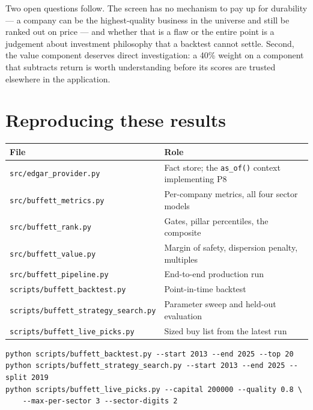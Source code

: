 \documentclass[11pt,a4paper]{article}
\begin{document}
Two open questions follow. The screen has no mechanism to pay up for
durability --- a company can be the highest-quality business in the universe and
still be ranked out on price --- and whether that is a flaw or the entire point
is a judgement about investment philosophy that a backtest cannot settle.
Second, the value component deserves direct investigation: a 40\% weight on a
component that subtracts return is worth understanding before its scores are
trusted elsewhere in the application.

\appendix

\section{Reproducing these results}

\begin{table}[h]
\centering
\sffamily\footnotesize
\begin{tabular}{@{}lp{9.2cm}@{}}
\toprule
\textbf{File} & \textbf{Role}\\
\midrule
\texttt{src/edgar\_provider.py} & Fact store; the \texttt{as\_of()} context implementing P8\\
\texttt{src/buffett\_metrics.py} & Per-company metrics, all four sector models\\
\texttt{src/buffett\_rank.py} & Gates, pillar percentiles, the composite\\
\texttt{src/buffett\_value.py} & Margin of safety, dispersion penalty, multiples\\
\texttt{src/buffett\_pipeline.py} & End-to-end production run\\
\texttt{scripts/buffett\_backtest.py} & Point-in-time backtest\\
\texttt{scripts/buffett\_strategy\_search.py} & Parameter sweep and held-out evaluation\\
\texttt{scripts/buffett\_live\_picks.py} & Sized buy list from the latest run\\
\bottomrule
\end{tabular}
\end{table}

\begin{verbatim}
python scripts/buffett_backtest.py --start 2013 --end 2025 --top 20
python scripts/buffett_strategy_search.py --start 2013 --end 2025 --split 2019
python scripts/buffett_live_picks.py --capital 200000 --quality 0.8 \
    --max-per-sector 3 --sector-digits 2
\end{verbatim}
\end{document}
